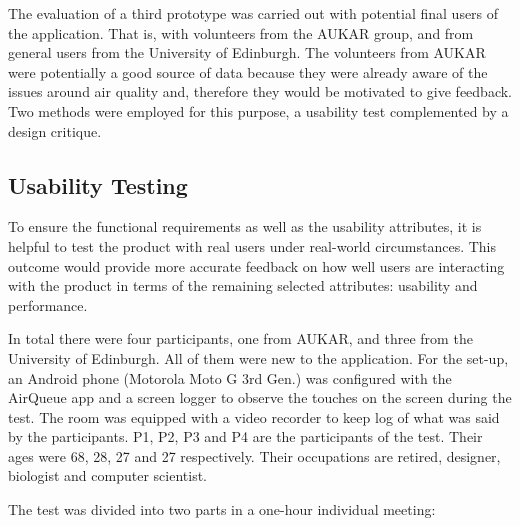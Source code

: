 The evaluation of a third prototype was carried out with potential final users of the application. That is, with volunteers from the AUKAR group, and from general users from the University of Edinburgh. The volunteers from AUKAR were potentially a good source of data because they were already aware of the issues around air quality and, therefore they would be motivated to give feedback. 
Two methods were employed for this purpose, a usability test complemented by a design critique. 

\subsection{Usability Testing}
To ensure the functional requirements as well as the usability attributes, it is helpful to test the product with real users under real-world circumstances. This outcome would provide more accurate feedback on how well users are interacting with the product in terms of the remaining selected attributes: usability and performance.

In total there were four participants, one from AUKAR, and three from the University of Edinburgh. All of them were new to the application. For the set-up, an Android phone (Motorola Moto G 3rd Gen.) was configured with the AirQueue app and a screen logger to observe the touches on the screen during the test. The room was equipped with a video recorder to keep log of what was said by the participants. P1, P2, P3 and P4 are the participants of the test. Their ages were 68, 28, 27 and 27 respectively. Their occupations are retired, designer, biologist and computer scientist. 

The test was divided into two parts in a one-hour individual meeting:

